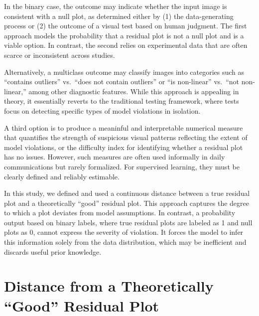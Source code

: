 \documentclass[]{interact}
\theoremstyle{plain}%
\theoremstyle{definition}
\theoremstyle{remark}
\begin{document}
In the binary case, the outcome may indicate whether the input image is
consistent with a null plot, as determined either by (1) the
data-generating process or (2) the outcome of a visual test based on
human judgment. The first approach models the probability that a
residual plot is not a null plot and is a viable option. In contrast,
the second relies on experimental data that are often scarce or
inconsistent across studies.

Alternatively, a multiclass outcome may classify images into categories
such as ``contains outliers'' vs.~``does not contain outliers'' or ``is
non-linear'' vs.~``not non-linear,'' among other diagnostic features.
While this approach is appealing in theory, it essentially reverts to
the traditional testing framework, where tests focus on detecting
specific types of model violations in isolation.

A third option is to produce a meaninful and interpretable numerical
measure that quantifies the strength of suspicious visual patterns
reflecting the extent of model violations, or the difficulty index for
identifying whether a residual plot has no issues. However, such
measures are often used informally in daily communications but rarely
formalized. For supervised learning, they must be clearly defined and
reliably estimable.

In this study, we defined and used a continuous distance between a true
residual plot and a theoretically ``good'' residual plot. This approach
captures the degree to which a plot deviates from model assumptions. In
contrast, a probability output based on binary labels, where true
residual plots are labeled as 1 and null plots as 0, cannot express the
severity of violation. It forces the model to infer this information
solely from the data distribution, which may be inefficient and discards
useful prior knowledge.

\section{Distance from a Theoretically ``Good'' Residual
Plot}\label{sec-model-distance-between-residual-plots}
\end{document}
